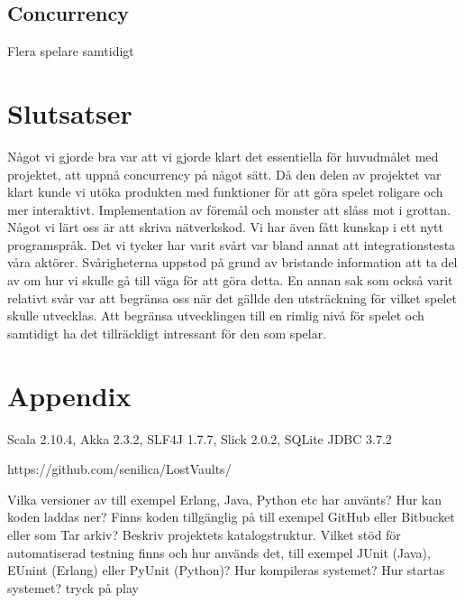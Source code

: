 \documentclass[a4paper]{article}
\begin{document}
\subsection{Concurrency}
Flera spelare samtidigt


\section{Slutsatser}
Något vi gjorde bra var att vi gjorde klart det essentiella för huvudmålet med projektet, att uppnå concurrency på något sätt. 
Då den delen av projektet var klart kunde vi utöka produkten med funktioner för att göra spelet roligare och mer interaktivt. 
Implementation av föremål och monster att slåss mot i grottan. 
Något vi lärt oss är att skriva nätverkskod. Vi har även fått kunskap i ett nytt programspråk.
Det vi tycker har varit svårt var bland annat att integrationstesta våra aktörer. Svårigheterna uppstod på grund av bristande 
information att ta del av om hur vi skulle gå till väga för att göra detta. En annan sak som också varit relativt svår var att 
begränsa oss när det gällde den utsträckning för vilket spelet skulle utvecklas. Att begränsa utvecklingen till en rimlig nivå för spelet 
och samtidigt ha det tillräckligt intressant för den som spelar.

\section{Appendix}

Scala 2.10.4, Akka 2.3.2, SLF4J 1.7.7, Slick 2.0.2, SQLite JDBC 3.7.2

https://github.com/senilica/LostVaults/

Vilka versioner av till exempel Erlang, Java, Python etc har använts?
Hur kan koden laddas ner? Finns koden tillgänglig på till exempel GitHub eller Bitbucket eller som Tar arkiv?  Beskriv projektets katalogstruktur.
Vilket stöd för automatiserad testning finns och hur används det, till exempel JUnit (Java), EUnint (Erlang) eller PyUnit (Python)?
Hur kompileras systemet?
Hur startas systemet? tryck på play
\end{document}
